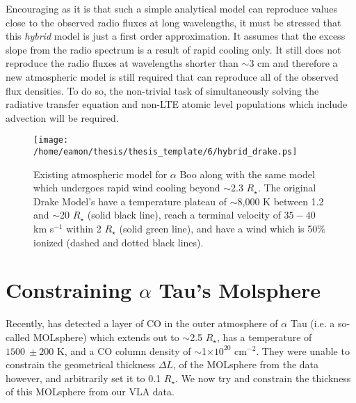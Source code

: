 Encouraging as it is that such a simple analytical model can reproduce values close to the observed radio fluxes at long wavelengths, it must be stressed that this \textit{hybrid} model is just a first order approximation. It assumes that the excess slope from the radio spectrum is a result of rapid cooling only. It still does not reproduce the radio fluxes at wavelengths shorter than $\sim 3$ cm and therefore a new atmospheric model is still required that can reproduce all of the observed flux densities. To do so, the non-trivial task of simultaneously solving the radiative transfer equation and non-LTE atomic level populations which include advection will be required.

\begin{figure}[hbt!]
\centering 
          \texttt{[image: /home/eamon/thesis/thesis\_template/6/hybrid\_drake.ps]}
\caption[Hybrid Atmospheric Model which undergoes rapid wind cooling]{Existing atmospheric model for $\alpha$ Boo \cite[`model A']{drake_1985} along with the same model which undergoes rapid wind cooling beyond $\sim$2.3 $R_{\star}$. The original Drake Model's have a temperature plateau of $\sim$8,000 K between 1.2 and $\sim$20 $R_{\star}$ (solid black line), reach a terminal velocity of $35-40$ km s$^{-1}$ within 2 $R_{\star}$ (solid green line), and have a wind which is 50\% ionized (dashed and dotted black lines).}
\label{fig6.9.3}
\end{figure}

\section{Constraining $\alpha$ Tau's Molsphere}\label{sec:6.5a}
Recently, \cite{ohnaka_2013} has detected a layer of CO in the outer atmosphere of $\alpha$ Tau (i.e. a so-called MOLsphere) which extends out to $\sim$2.5 $R_{\star}$, has a temperature of $1500 \ \pm 200$ K, and a CO column density of $\sim$1$\times 10^{20}$ cm$^{-2}$. They were unable to constrain the geometrical thickness $\Delta L$, of the MOLsphere from the data however, and arbitrarily set it to 0.1 $R_{\star}$. We now try and constrain the thickness of this MOLsphere from our VLA data.

